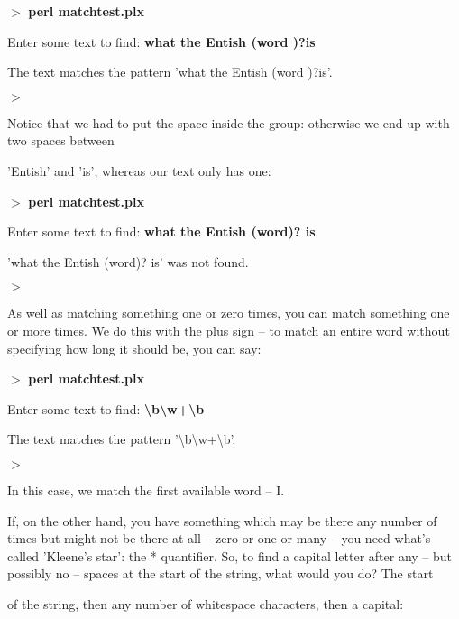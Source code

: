 \documentclass[a4paper,11pt]{book}
\begin{document}
\noindent 

\noindent $>$ \textbf{perl matchtest.plx}

\noindent Enter some text to find: \textbf{what the Entish (word )?is}

\noindent The text matches the pattern 'what the Entish (word )?is'.

\noindent $>$

\noindent 

\noindent Notice that we had to put the space inside the group: otherwise we end up with two spaces between

\noindent 'Entish' and 'is', whereas our text only has one:

\noindent 

\noindent $>$ \textbf{perl matchtest.plx}

\noindent Enter some text to find: \textbf{what the Entish (word)? is}

\noindent 'what the Entish (word)? is' was not found.

\noindent $>$

\noindent 

\noindent As well as matching something one or zero times, you can match something one or more times. We do this with the plus sign -- to match an entire word without specifying how long it should be, you can say:

\noindent 

\noindent $>$ \textbf{perl matchtest.plx}

\noindent Enter some text to find: \textbf{\textbackslash b\textbackslash w+\textbackslash b}

\noindent The text matches the pattern '\textbackslash b\textbackslash w+\textbackslash b'.

\noindent $>$

\noindent 

\noindent In this case, we match the first available word -- I.

\noindent 

\noindent If, on the other hand, you have something which may be there any number of times but might not be there at all -- zero or one or many -- you need what's called 'Kleene's star': the * quantifier. So, to find a capital letter after any -- but possibly no -- spaces at the start of the string, what would you do? The start

\noindent of the string, then any number of whitespace characters, then a capital:

\noindent 
\end{document}
